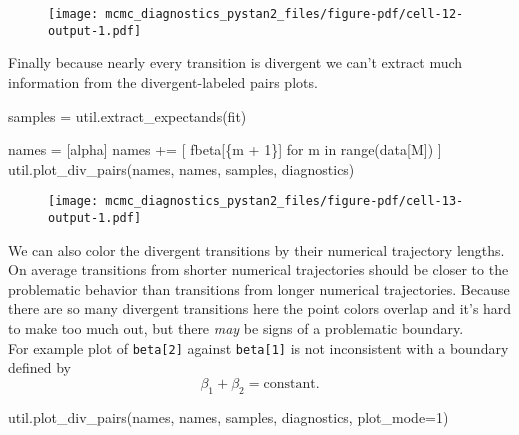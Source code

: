 \documentclass[
  letterpaper,
  DIV=11,
  numbers=noendperiod]{scrartcl}
\newenvironment{Shaded}{\begin{snugshade}}{\end{snugshade}}
\newcommand{\BuiltInTok}[1]{\textcolor[rgb]{0.00,0.23,0.31}{#1}}
\newcommand{\ControlFlowTok}[1]{\textcolor[rgb]{0.00,0.23,0.31}{#1}}
\newcommand{\DecValTok}[1]{\textcolor[rgb]{0.68,0.00,0.00}{#1}}
\newcommand{\KeywordTok}[1]{\textcolor[rgb]{0.00,0.23,0.31}{#1}}
\newcommand{\NormalTok}[1]{\textcolor[rgb]{0.00,0.23,0.31}{#1}}
\newcommand{\OperatorTok}[1]{\textcolor[rgb]{0.37,0.37,0.37}{#1}}
\newcommand{\SpecialCharTok}[1]{\textcolor[rgb]{0.37,0.37,0.37}{#1}}
\newcommand{\SpecialStringTok}[1]{\textcolor[rgb]{0.13,0.47,0.30}{#1}}
\newcommand{\StringTok}[1]{\textcolor[rgb]{0.13,0.47,0.30}{#1}}
\begin{document}
\begin{figure}[H]

{\centering \texttt{[image: mcmc\_diagnostics\_pystan2\_files/figure-pdf/cell-12-output-1.pdf]}

}

\end{figure}

Finally because nearly every transition is divergent we can't extract
much information from the divergent-labeled pairs plots.

\begin{Shaded}
\begin{Highlighting}[]
\NormalTok{samples }\OperatorTok{=}\NormalTok{ util.extract\_expectands(fit)}

\NormalTok{names }\OperatorTok{=}\NormalTok{ [}\StringTok{\textquotesingle{}alpha\textquotesingle{}}\NormalTok{]}
\NormalTok{names }\OperatorTok{+=}\NormalTok{ [ }\SpecialStringTok{f\textquotesingle{}beta[}\SpecialCharTok{\{}\NormalTok{m }\OperatorTok{+} \DecValTok{1}\SpecialCharTok{\}}\SpecialStringTok{]\textquotesingle{}} \ControlFlowTok{for}\NormalTok{ m }\KeywordTok{in} \BuiltInTok{range}\NormalTok{(data[}\StringTok{\textquotesingle{}M\textquotesingle{}}\NormalTok{]) ]}
\NormalTok{util.plot\_div\_pairs(names, names, samples, diagnostics)}
\end{Highlighting}
\end{Shaded}

\begin{figure}[H]

{\centering \texttt{[image: mcmc\_diagnostics\_pystan2\_files/figure-pdf/cell-13-output-1.pdf]}

}

\end{figure}

We can also color the divergent transitions by their numerical
trajectory lengths. On average transitions from shorter numerical
trajectories should be closer to the problematic behavior than
transitions from longer numerical trajectories. Because there are so
many divergent transitions here the point colors overlap and it's hard
to make too much out, but there \emph{may} be signs of a problematic
boundary.\\
For example plot of \texttt{beta{[}2{]}} against \texttt{beta{[}1{]}} is
not inconsistent with a boundary defined by \[
\beta_{1} + \beta_{2} = \mathrm{constant}.
\]

\begin{Shaded}
\begin{Highlighting}[]
\NormalTok{util.plot\_div\_pairs(names, names, samples, diagnostics, plot\_mode}\OperatorTok{=}\DecValTok{1}\NormalTok{)}
\end{Highlighting}
\end{Shaded}
\end{document}
